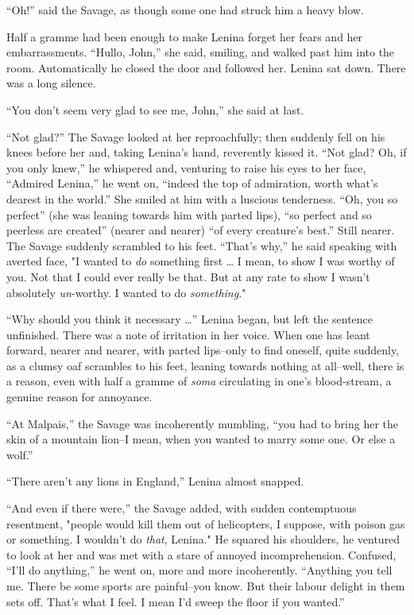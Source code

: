\documentclass[12pt]{report}
\begin{document}
``Oh!'' said the Savage, as though some one had struck him a heavy blow.

Half a gramme had been enough to make Lenina forget her fears and her
embarrassments. ``Hullo, John,'' she said, smiling, and walked past him
into the room. Automatically he closed the door and followed her. Lenina
sat down. There was a long silence.

``You don't seem very glad to see me, John,'' she said at last.

``Not glad?'' The Savage looked at her reproachfully; then suddenly fell
on his knees before her and, taking Lenina's hand, reverently kissed it.
``Not glad? Oh, if you only knew,'' he whispered and, venturing to raise
his eyes to her face, ``Admired Lenina,'' he went on, ``indeed the top
of admiration, worth what's dearest in the world.'' She smiled at him
with a luscious tenderness. ``Oh, you so perfect'' (she was leaning
towards him with parted lips), ``so perfect and so peerless are
created'' (nearer and nearer) ``of every creature's best.'' Still
nearer. The Savage suddenly scrambled to his feet. ``That's why,'' he
said speaking with averted face, "I wanted to \emph{do} something first
\ldots{} I mean, to show I was worthy of you. Not that I could ever
really be that. But at any rate to show I wasn't absolutely
\emph{un}-worthy. I wanted to do \emph{something}."

``Why should you think it necessary \ldots{}'' Lenina began, but left
the sentence unfinished. There was a note of irritation in her voice.
When one has leant forward, nearer and nearer, with parted lips--only to
find oneself, quite suddenly, as a clumsy oaf scrambles to his feet,
leaning towards nothing at all--well, there is a reason, even with half
a gramme of \emph{soma} circulating in one's blood-stream, a genuine
reason for annoyance.

``At Malpais,'' the Savage was incoherently mumbling, ``you had to bring
her the skin of a mountain lion--I mean, when you wanted to marry some
one. Or else a wolf.''

``There aren't any lions in England,'' Lenina almost snapped.

``And even if there were,'' the Savage added, with sudden contemptuous
resentment, "people would kill them out of helicopters, I suppose, with
poison gas or something. I wouldn't do \emph{that}, Lenina." He squared
his shoulders, he ventured to look at her and was met with a stare of
annoyed incomprehension. Confused, ``I'll do anything,'' he went on,
more and more incoherently. ``Anything you tell me. There be some sports
are painful--you know. But their labour delight in them sets off. That's
what I feel. I mean I'd sweep the floor if you wanted.''
\end{document}

